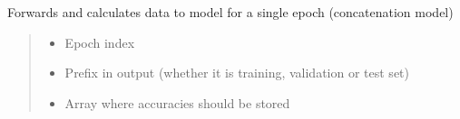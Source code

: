 \documentclass[letterpaper,10pt,english]{sphinxmanual}
\begin{document}
\begin{fulllineitems}
\begin{fulllineitems}
\begin{quote}
\begin{description}
\end{description}\end{quote}

\end{fulllineitems}


\begin{fulllineitems}
\label{\detokenize{net:net.UVANEMO.__module__}}
\pysigstartsignatures
{}
\pysigstopsignatures
\end{fulllineitems}


\begin{fulllineitems}
\label{\detokenize{net:net.UVANEMO.__multi_evaluate_forward}}
\pysigstartsignatures
{}
\pysigstopsignatures
\sphinxAtStartPar
Forwards and calculates data to model for a single epoch (concatenation model)
\begin{quote}\begin{description}
\begin{itemize}
\item {} 
\sphinxAtStartPar
{} \textendash{} Epoch index

\item {} 
\sphinxAtStartPar
{} \textendash{} Prefix in output (whether it is training, validation or test set)

\item {} 
\sphinxAtStartPar
{} \textendash{} Array where accuracies should be stored


\end{itemize}
\end{description}
\end{quote}
\end{fulllineitems}
\end{fulllineitems}
\end{document}
